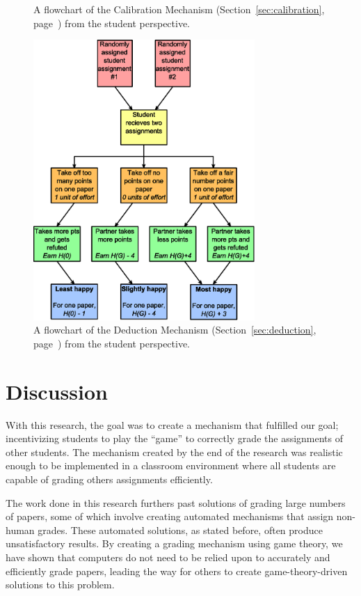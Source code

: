 \documentclass[12pt, Arial]{article}
\begin{document}
{\begin{figure}
		\caption {A flowchart of the Calibration Mechanism (Section~\ref{sec:calibration}, page~\pageref{sec:calibration}) from the student perspective.\label{fig:calibration}}
\end{figure}
\begin{figure}
	\centering
		\includegraphics[width=0.75\textwidth]{Flowchart-Deduction.eps}
		\caption {A flowchart of the Deduction Mechanism (Section~\ref{sec:deduction}, page~\pageref{sec:deduction}) from the student perspective.\label{fig:deduction}}
\end{figure}
}
\section{Discussion}
With this research, the goal was to create a mechanism that fulfilled our goal; incentivizing students to play the ``game'' to correctly grade the assignments of other students. The mechanism created by the end of the research was realistic enough to be implemented in a classroom environment where all students are capable of grading others assignments efficiently.

The work done in this research furthers past solutions of grading large numbers of papers, some of which involve creating automated mechanisms that assign non-human grades. These automated solutions, as stated before, often produce unsatisfactory results. By creating a grading mechanism using game theory, we have shown that computers do not need to be relied upon to accurately and efficiently grade papers, leading the way for others to create game-theory-driven solutions to this problem.
\end{document}
